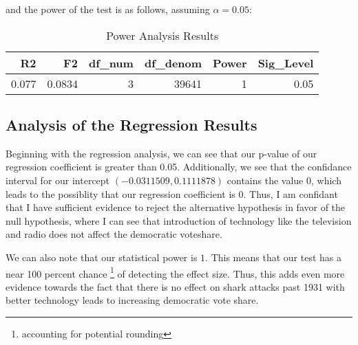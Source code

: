 \documentclass[12pt]{article}
\begin{document}
and the power of the test is as follows, assuming $\alpha = 0.05$:
\begin{table}[H]
    \caption{Power Analysis Results}
    \centering
    \begin{tabular}[t]{rrrrrr}
    \toprule
    R2 & F2 & df\_num & df\_denom & Power & Sig\_Level\\
    \midrule
    0.077 & 0.0834 & 3 & 39641 & 1 & 0.05\\
    \bottomrule
    \end{tabular}
\end{table}
 \subsection{Analysis of the Regression Results}
Beginning with the regression analysis, we can see that our p-value of our regression coefficient is greater than 0.05. Additionally, we see that the confidance interval for our intercept $(-0.0311509, 0.1111878)$ contains the value 0, which leads to the possiblity that our regression coefficient is 0. Thus, I am confidant that I have sufficient evidence to reject the alternative hypothesis in favor of the null hypothesis, where I can see that introduction of technology like the television and radio does not affect the democratic voteshare. 



We can also note that our statistical power is $1$. This means that our test has a near 100 percent chance \footnote{accounting for potential rounding} of detecting the effect size. Thus, this adds even more evidence towards the fact that there is no effect on shark attacks past 1931 with better technology leads to increasing democratic vote share. 
\end{document}
